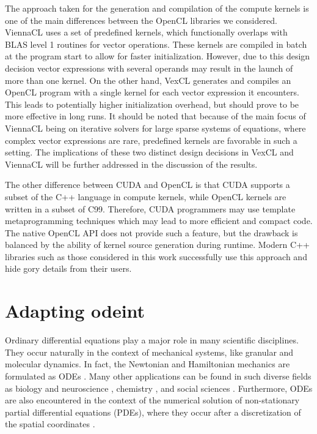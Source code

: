 \documentclass[final]{siamltex}
\begin{document}
The approach taken for the generation and compilation of the compute kernels is
one of the main differences between the OpenCL libraries we considered.
ViennaCL uses a set of predefined kernels, which functionally overlaps with
BLAS level 1 routines for vector operations.  These kernels are compiled in
batch at the program start to allow for faster initialization. However, due to
this design decision vector expressions with several operands may result in the launch of more
than one kernel.  On the other hand, VexCL generates and compiles an OpenCL
program with a single kernel for each vector expression it encounters.  This
leads to potentially higher initialization overhead, but should prove to be
more effective in long runs. It should be noted that because of the main focus
of ViennaCL being on iterative solvers for large sparse systems of equations,
where complex vector expressions are rare, predefined kernels are favorable in
such a setting.  The implications of these two distinct design decisions in
VexCL and ViennaCL will be further addressed in the discussion of the results.

The other difference between CUDA and OpenCL is that CUDA supports a subset of
the C++ language in compute kernels, while OpenCL kernels are written in a subset
of C99. Therefore, CUDA programmers may use template metaprogramming techniques
which may lead to more efficient and compact code. The native OpenCL API does
not provide such a feature, but the drawback is balanced by the ability of
kernel source generation during runtime. Modern C++ libraries such as those
considered in this work successfully use this approach and hide gory details
from their users.




%
%
\section{Adapting odeint} \label{sec:adapting-odeint}

Ordinary differential equations play a major role in many scientific
disciplines. They occur naturally in the context of mechanical systems, like
granular \cite{poschel_computational_2005} and molecular dynamics. In fact, the  %
Newtonian and Hamiltonian mechanics are formulated as ODEs
\cite{landau_mechanics_1976}.  Many other applications can be found in such
diverse fields as biology \cite{brauer_mathematical_2001,Murray-93} and
neuroscience \cite{izhikevich_dynamical_2006}, chemistry
\cite{atkins_physical_2001}, and social sciences \cite{Helbing01}. Furthermore,
ODEs are also encountered in the context of the numerical solution of
non-stationary partial differential equations (PDEs), where they occur after
a discretization of the spatial coordinates \cite{Hundsdorfer2003}.
\end{document}
